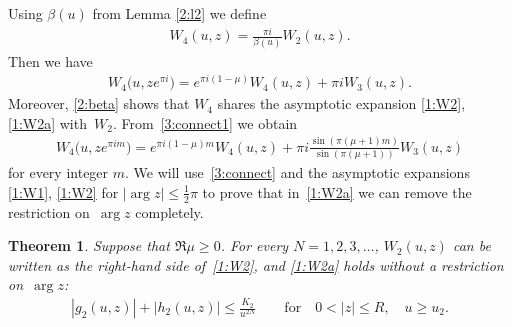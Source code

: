 \documentclass[11pt]{article}
\numberwithin{equation}{section}
\newtheorem{Theorem}{Theorem}[section]
\begin{document}
Using $\beta(u)$ from Lemma \ref{2:l2} we def\/ine
\begin{gather*} W_4(u,z)=\frac{\pi i}{\beta(u)} W_2(u,z) .\end{gather*}
Then we have
\begin{gather}\label{3:connect1}
W_4\big(u,ze^{\pi i}\big)=e^{\pi i(1-\mu)} W_4(u,z)+\pi i W_3(u,z) .
\end{gather}
Moreover, \eqref{2:beta} shows that $W_4$ shares the asymptotic expansion \eqref{1:W2}, \eqref{1:W2a} with~$W_2$.
From~\eqref{3:connect1} we obtain
\begin{gather}\label{3:connect}
W_4\big(u,ze^{\pi im}\big)=e^{\pi i (1-\mu)m} W_4(u,z)+\pi i\frac{\sin(\pi(\mu+1)m)}{\sin(\pi(\mu+1))} W_3(u,z)
\end{gather}
for every integer $m$.
We will use~\eqref{3:connect} and the asymptotic expansions \eqref{1:W1}, \eqref{1:W2} for $|\arg z|\le \frac12\pi$
to prove that in~\eqref{1:W2a} we can remove the restriction on~$\arg z$ completely.

\begin{Theorem}\label{3:t1}
Suppose that $\Re\mu\ge0$. For every $N=1,2,3,\dots$, $W_2(u,z)$ can be written as the right-hand side of~\eqref{1:W2},
and \eqref{1:W2a} holds without a restriction on~$\arg z$:
\begin{gather*}%
|g_2(u,z)|+|h_2(u,z)|\le \frac{K_2}{u^{2N}}\qquad\text{for} \quad 0<|z|\le R, \quad u\ge u_2.
\end{gather*}
\end{Theorem}
\end{document}
